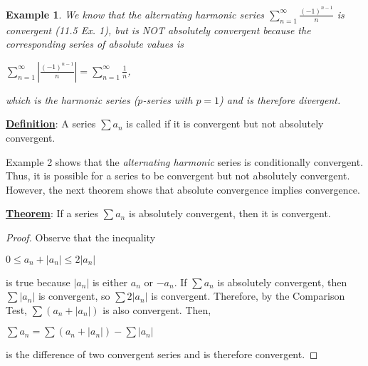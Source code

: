 \documentclass[paper=a4, fontsize=11pt]{scrartcl} %
\numberwithin{equation}{section} %
\numberwithin{figure}{section} %
\numberwithin{table}{section} %
\newtheorem{example}{Example}
\newcommand{\ds}{\displaystyle}
\newcommand{\enter}{\vspace{5mm}}
\newcommand{\senter}{\vspace{3mm}}
\begin{document}
\begin{example}
We know that the alternating harmonic series $\ds\sum_{n=1}^{\infty}\frac{(-1)^{n-1}}{n}$ is convergent (11.5 Ex. 1), but is NOT absolutely convergent because the corresponding series of absolute values is

\senter

\begin{center}
$\ds\sum_{n=1}^{\infty}\left|\frac{(-1)^{n-1}}{n}\right|=\sum_{n=1}^{\infty}\frac{1}{n}$,
\end{center}

\senter

\noindent which is the harmonic series ($p$-series with $p=1$) and is therefore divergent.
\end{example}

\begin{framed}
\noindent\underline{\textbf{Definition}}: A series $\ds\sum a_n$ is called \underline{\hphantom{aaconditionallyaa}} \text{} \underline{\hphantom{aaconvergentaa}} if it is convergent but not absolutely convergent.
\end{framed}

\enter

\noindent Example 2 shows that the \emph{alternating harmonic} series is conditionally convergent. Thus, it is possible for a series to be convergent but not absolutely convergent. However, the next theorem shows that absolute convergence implies convergence.

\newpage

\begin{framed}
\noindent\underline{\textbf{Theorem}}: If a series $\ds\sum a_n$ is absolutely convergent, then it is convergent.
\end{framed}

\begin{proof}
Observe that the inequality

\begin{center}
$0\leq a_n+|a_n|\leq2|a_n|$
\end{center}

\senter

\noindent is true because $|a_n|$ is either $a_n$ or $-a_n$. If $\sum a_n$ is absolutely convergent, then $\sum|a_n|$ is convergent, so $\sum2|a_n|$ is convergent. Therefore, by the Comparison Test, $\sum(a_n+|a_n|)$ is also convergent. Then,

\senter

\begin{center}
$\ds\sum a_n=\sum (a_n+|a_n|)-\sum|a_n|$
\end{center}

\senter

\noindent is the difference of two convergent series and is therefore convergent.
\end{proof}
\end{document}
